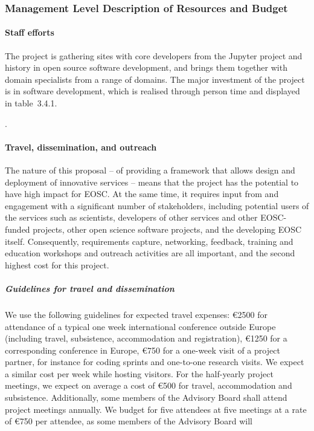 \subsubsection{Management Level Description of Resources and Budget}
\label{sect:budget-details}

\paragraph{Staff efforts}


The \TheProject project is gathering sites with core developers from
the Jupyter project and history in open source software development,
and brings them together with domain specialists from a range of
domains. The major investment of the project is in software
development, which is realised through person time and displayed in table~3.4.1.

\ifgrantagreement.\else{} %

\wpfig[label=fig:staffeffort,caption=Summary of Staff Efforts]
\fi

\paragraph{Travel, dissemination, and outreach}

The nature of this proposal -- of providing a framework that allows
design and deployment of innovative services -- means that the project
has the potential to have high impact for EOSC. At the same time, it
requires input from and engagement with a significant number of
stakeholders, including potential users of the services such as
scientists, developers of other services and other EOSC-funded
projects, other open science software projects, and the developing
EOSC itself. Consequently, requirements capture, networking, feedback,
training and education workshops and outreach activities are all
important, and the second highest cost for this project.

\subparagraph{Guidelines for travel and dissemination}
\label{sect:budget-details-travel}

We use the following guidelines for expected travel expenses:
\euro{2500} for attendance of a typical one week international
conference outside Europe (including travel, subsistence,
accommodation and registration), \euro{1250} for a corresponding
conference in Europe, \euro{750} for a one-week visit of a project
partner, for instance for coding sprints and one-to-one
research visits. We expect a similar cost per week while hosting
visitors. For the half-yearly project meetings, we expect on average a
cost of \euro{500} for travel, accommodation and subsistence.
Additionally, some members of the Advisory Board shall attend project meetings annually. We budget
for five attendees at five meetings at a rate of \euro{750} per attendee,
as some members of the Advisory Board will

